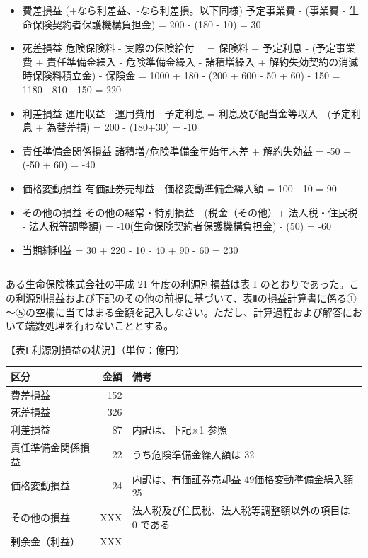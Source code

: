 \documentclass[report,gutter=10mm,fore-edge=10mm,uplatex,dvipdfmx]{jlreq}
\begin{document}

\begin{itemize}
\tightlist
\item
  費差損益 (+なら利差益、-なら利差損。以下同様) 予定事業費 - (事業費 -
  生命保険契約者保護機構負担金) = 200 - (180 - 10) = 30
\item
  死差損益 危険保険料 - 実際の保険給付 　= 保険料 + 予定利息 -
  (予定事業費 + 責任準備金繰入 - 危険準備金繰入 - 諸積増繰入 +
  解約失効契約の消滅時保険料積立金) - 保険金 = 1000 + 180 - (200 + 600 -
  50 + 60) - 150 = 1180 - 810 - 150 = 220
\item
  利差損益 運用収益 - 運用費用 - 予定利息 = 利息及び配当金等収入 -
  (予定利息 + 為替差損) = 200 - (180+30) = -10
\item
  責任準備金関係損益 諸積増/危険準備金年始年末差 + 解約失効益 = -50 +
  (-50 + 60) = -40
\item
  価格変動損益 有価証券売却益 - 価格変動準備金繰入額 = 100 - 10 = 90
\item
  その他の損益 その他の経常・特別損益 - (税金（その他）+ 法人税・住民税
  - 法人税等調整額) = -10(生命保険契約者保護機構負担金) - (50) = -60
\item
  当期純利益 = 30 + 220 - 10 - 40 + 90 - 60 = 230
\end{itemize}

\begin{center}\rule{0.5\linewidth}{0.5pt}\end{center}


ある生命保険株式会社の平成 21 年度の利源別損益は表 I
のとおりであった。この利源別損益および下記のその他の前提に基づいて、表Ⅱの損益計算書に係る①～⑤の空欄に当てはまる金額を記入しなさい。ただし、計算過程および解答において端数処理を行わないこととする。

【表Ⅰ 利源別損益の状況】（単位：億円）

\begin{tabular}{|l|r|l|}
\hline 
 区分& 金額& 備考\\ \hline
 費差損益&152&\\ \hline
 死差損益&326&\\ \hline
 利差損益&87& 内訳は、下記※1 参照\\ \hline
 責任準備金関係損益&22& うち危険準備金繰入額は 32\\ \hline
 価格変動損益&24& 内訳は、有価証券売却益 49価格変動準備金繰入額 25\\ \hline
 その他の損益& XXX& 法人税及び住民税、法人税等調整額以外の項目は 0 である\\ \hline 
 剰余金（利益）& XXX\\ \hline
\end{tabular}
\end{document}
